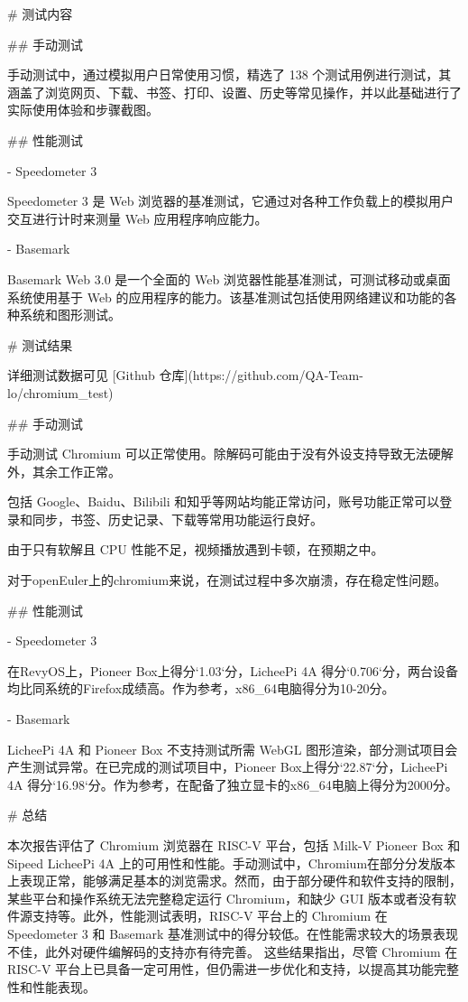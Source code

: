 \documentclass{article}
\begin{document}
\begin{markdown}
# 测试内容

## 手动测试

手动测试中，通过模拟用户日常使用习惯，精选了 138 个测试用例进行测试，其涵盖了浏览网页、下载、书签、打印、设置、历史等常见操作，并以此基础进行了实际使用体验和步骤截图。

## 性能测试

- Speedometer 3

Speedometer 3 是 Web 浏览器的基准测试，它通过对各种工作负载上的模拟用户交互进行计时来测量 Web 应用程序响应能力。

- Basemark

Basemark Web 3.0 是一个全面的 Web 浏览器性能基准测试，可测试移动或桌面系统使用基于 Web 的应用程序的能力。该基准测试包括使用网络建议和功能的各种系统和图形测试。

# 测试结果

详细测试数据可见 [Github 仓库](https://github.com/QA-Team-lo/chromium_test)

## 手动测试

手动测试 Chromium 可以正常使用。除解码可能由于没有外设支持导致无法硬解外，其余工作正常。

包括 Google、Baidu、Bilibili 和知乎等网站均能正常访问，账号功能正常可以登录和同步，书签、历史记录、下载等常用功能运行良好。

由于只有软解且 CPU 性能不足，视频播放遇到卡顿，在预期之中。

对于openEuler上的chromium来说，在测试过程中多次崩溃，存在稳定性问题。

## 性能测试

- Speedometer 3

在RevyOS上，Pioneer Box上得分`1.03`分，LicheePi 4A 得分`0.706`分，两台设备均比同系统的Firefox成绩高。作为参考，x86_64电脑得分为10-20分。

- Basemark

LicheePi 4A 和 Pioneer Box 不支持测试所需 WebGL 图形渲染，部分测试项目会产生测试异常。在已完成的测试项目中，Pioneer Box上得分`22.87`分，LicheePi 4A 得分`16.98`分。作为参考，在配备了独立显卡的x86_64电脑上得分为2000分。

# 总结

本次报告评估了 Chromium 浏览器在 RISC-V 平台，包括 Milk-V Pioneer Box 和 Sipeed LicheePi 4A 上的可用性和性能。手动测试中，Chromium在部分分发版本上表现正常，能够满足基本的浏览需求。然而，由于部分硬件和软件支持的限制，某些平台和操作系统无法完整稳定运行 Chromium，和缺少 GUI 版本或者没有软件源支持等。此外，性能测试表明，RISC-V 平台上的 Chromium 在 Speedometer 3 和 Basemark 基准测试中的得分较低。在性能需求较大的场景表现不佳，此外对硬件编解码的支持亦有待完善。
这些结果指出，尽管 Chromium 在 RISC-V 平台上已具备一定可用性，但仍需进一步优化和支持，以提高其功能完整性和性能表现。

\end{markdown}
\end{document}
